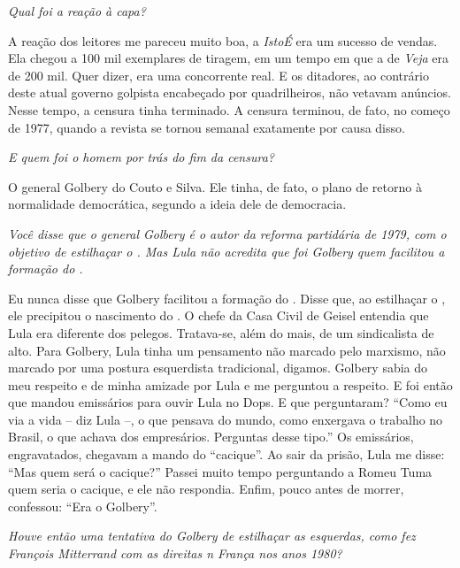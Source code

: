 \itshape
 Qual foi a reação à capa?

\normalfont 
A reação dos leitores me pareceu muito boa, a
\emph{IstoÉ} era um sucesso de vendas. Ela chegou a 100 mil exemplares
de tiragem, em um tempo em que a de \emph{Veja} era de 200 mil. Quer
dizer, era uma concorrente real. E os ditadores, ao contrário deste
atual governo golpista encabeçado por quadrilheiros, não vetavam
anúncios. Nesse tempo, a censura tinha terminado. A censura terminou, de
fato, no começo de 1977, quando a revista se tornou semanal exatamente
por causa disso.

\itshape
 E quem foi o homem por trás do fim da censura?

\normalfont 
O general Golbery do Couto e Silva. Ele tinha, de fato, o
plano de retorno à normalidade democrática, segundo a ideia dele de
democracia.

\itshape
 Você disse que o general Golbery é o autor da reforma
partidária de 1979, com o objetivo de estilhaçar o . Mas Lula não
acredita que foi Golbery quem facilitou a formação do .

\normalfont 
Eu nunca disse que Golbery facilitou a formação do .
Disse que, ao estilhaçar o , ele precipitou o nascimento do . O
chefe da Casa Civil de Geisel entendia que Lula era diferente dos
pelegos. Tratava-se, além do mais, de um sindicalista de  alto. Para
Golbery, Lula tinha um pensamento não marcado pelo marxismo, não marcado
por uma postura esquerdista tradicional, digamos. Golbery sabia do meu
respeito e de minha amizade por Lula e me perguntou a respeito. E foi
então que mandou emissários para ouvir Lula no Dops. E que perguntaram?
``Como eu via a vida -- diz Lula --, o que pensava do mundo, como
enxergava o trabalho no Brasil, o que achava dos empresários. Perguntas
desse tipo.'' Os emissários, engravatados, chegavam a mando do
``cacique''. Ao sair da prisão, Lula me disse: ``Mas quem será o
cacique?'' Passei muito tempo perguntando a Romeu Tuma quem seria o
cacique, e ele não respondia. Enfim, pouco antes de morrer, confessou:
``Era o Golbery''.

\itshape
 Houve então uma tentativa do Golbery de estilhaçar as
esquerdas, como fez François Mitterrand com as direitas n França nos
anos 1980?

